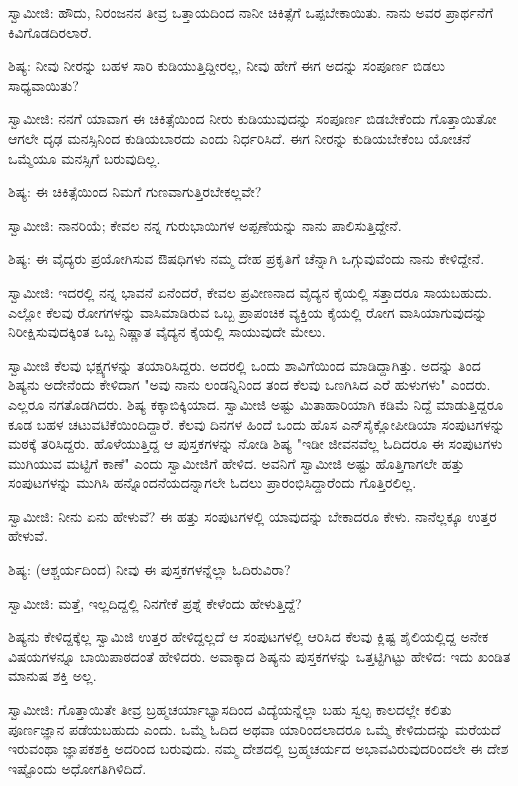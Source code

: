 ಸ್ವಾಮೀಜಿ: ಹೌದು, ನಿರಂಜನನ ತೀವ್ರ ಒತ್ತಾಯದಿಂದ ನಾನೀ ಚಿಕಿತ್ಸೆಗೆ ಒಪ್ಪಬೇಕಾಯಿತು. ನಾನು ಅವರ ಪ್ರಾರ್ಥನೆಗೆ ಕಿವಿಗೊಡದಿರಲಾರೆ.

ಶಿಷ್ಯ: ನೀವು ನೀರನ್ನು ಬಹಳ ಸಾರಿ ಕುಡಿಯುತ್ತಿದ್ದೀರಲ್ಲ, ನೀವು ಹೇಗೆ ಈಗ ಅದನ್ನು ಸಂಪೂರ್ಣ ಬಿಡಲು ಸಾಧ್ಯವಾಯಿತು?

ಸ್ವಾಮೀಜಿ: ನನಗೆ ಯಾವಾಗ ಈ ಚಿಕಿತ್ಸೆಯಿಂದ ನೀರು ಕುಡಿಯುವುದನ್ನು ಸಂಪೂರ್ಣ ಬಿಡಬೇಕೆಂದು ಗೊತ್ತಾಯಿತೋ ಆಗಲೇ ದೃಢ ಮನಸ್ಸಿನಿಂದ ಕುಡಿಯಬಾರದು ಎಂದು ನಿರ್ಧರಿಸಿದೆ. ಈಗ ನೀರನ್ನು ಕುಡಿಯಬೇಕೆಂಬ ಯೋಚನೆ ಒಮ್ಮೆಯೂ ಮನಸ್ಸಿಗೆ ಬರುವುದಿಲ್ಲ.

ಶಿಷ್ಯ: ಈ ಚಿಕಿತ್ಸೆಯಿಂದ ನಿಮಗೆ ಗುಣವಾಗುತ್ತಿರಬೇಕಲ್ಲವೇ?

ಸ್ವಾಮೀಜಿ: ನಾನರಿಯೆ; ಕೇವಲ ನನ್ನ ಗುರುಭಾಯಿಗಳ ಅಪ್ಪಣೆಯನ್ನು ನಾನು ಪಾಲಿಸುತ್ತಿದ್ದೇನೆ.

ಶಿಷ್ಯ: ಈ ವೈದ್ಯರು ಪ್ರಯೋಗಿಸುವ ಔಷಧಿಗಳು ನಮ್ಮ ದೇಹ ಪ್ರಕೃತಿಗೆ ಚೆನ್ನಾಗಿ ಒಗ್ಗುವುವೆಂದು ನಾನು ಕೇಳಿದ್ದೇನೆ.

ಸ್ವಾಮೀಜಿ: ಇದರಲ್ಲಿ ನನ್ನ ಭಾವನೆ ಏನೆಂದರೆ, ಕೇವಲ ಪ್ರವೀಣನಾದ ವೈದ್ಯನ ಕೈಯಲ್ಲಿ ಸತ್ತಾದರೂ ಸಾಯಬಹುದು. ಎಲ್ಲೋ ಕೆಲವು ರೋಗಗಳನ್ನು ವಾಸಿಮಾಡಿರುವ ಒಬ್ಬ ಪ್ರಾಪಂಚಿಕ ವ್ಯಕ್ತಿಯ ಕೈಯಲ್ಲಿ ರೋಗ ವಾಸಿಯಾಗುವುದನ್ನು ನಿರೀಕ್ಷಿಸುವುದಕ್ಕಿಂತ ಒಬ್ಬ ನಿಷ್ಣಾತ ವೈದ್ಯನ ಕೈಯಲ್ಲಿ ಸಾಯುವುದೇ ಮೇಲು.

ಸ್ವಾಮೀಜಿ ಕೆಲವು ಭಕ್ಷ್ಯಗಳನ್ನು ತಯಾರಿಸಿದ್ದರು. ಅದರಲ್ಲಿ ಒಂದು ಶಾವಿಗೆಯಿಂದ ಮಾಡಿದ್ದಾಗಿತ್ತು. ಅದನ್ನು ತಿಂದ ಶಿಷ್ಯನು ಅದೇನೆಂದು ಕೇಳಿದಾಗ "ಅವು ನಾನು ಲಂಡನ್ನಿನಿಂದ ತಂದ ಕೆಲವು ಒಣಗಿಸಿದ ಎರೆ ಹುಳುಗಳು" ಎಂದರು. ಎಲ್ಲರೂ ನಗತೊಡಗಿದರು. ಶಿಷ್ಯ ಕಕ್ಕಾಬಿಕ್ಕಿಯಾದ. ಸ್ವಾಮೀಜಿ ಅಷ್ಟು ಮಿತಾಹಾರಿಯಾಗಿ ಕಡಿಮೆ ನಿದ್ದೆ ಮಾಡುತ್ತಿದ್ದರೂ ಕೂಡ ಬಹಳ ಚಟುವಟಿಕೆಯಿಂದಿದ್ದಾರೆ. ಕೆಲವು ದಿನಗಳ ಹಿಂದೆ ಒಂದು ಹೊಸ ಎನ್‌ಸೈಕ್ಲೋಪೀಡಿಯಾ ಸಂಪುಟಗಳನ್ನು ಮಠಕ್ಕೆ ತರಿಸಿದ್ದರು. ಹೊಳೆಯುತ್ತಿದ್ದ ಆ ಪುಸ್ತಕಗಳನ್ನು ನೋಡಿ ಶಿಷ್ಯ "ಇಡೀ ಜೀವನವೆಲ್ಲ ಓದಿದರೂ ಈ ಸಂಪುಟಗಳು ಮುಗಿಯುವ ಮಟ್ಟಿಗೆ ಕಾಣೆ" ಎಂದು ಸ್ವಾಮೀಜಿಗೆ ಹೇಳಿದ. ಅವನಿಗೆ ಸ್ವಾಮೀಜಿ ಅಷ್ಟು ಹೊತ್ತಿಗಾಗಲೇ ಹತ್ತು ಸಂಪುಟಗಳನ್ನು ಮುಗಿಸಿ ಹನ್ನೊಂದನೆಯದನ್ನಾಗಲೇ ಓದಲು ಪ್ರಾರಂಭಿಸಿದ್ದಾರೆಂದು ಗೊತ್ತಿರಲಿಲ್ಲ.

ಸ್ವಾಮೀಜಿ: ನೀನು ಏನು ಹೇಳುವೆ? ಈ ಹತ್ತು ಸಂಪುಟಗಳಲ್ಲಿ ಯಾವುದನ್ನು ಬೇಕಾದರೂ ಕೇಳು. ನಾನೆಲ್ಲಕ್ಕೂ ಉತ್ತರ ಹೇಳುವೆ.

ಶಿಷ್ಯ: (ಆಶ್ಚರ್ಯದಿಂದ) ನೀವು ಈ ಪುಸ್ತಕಗಳನ್ನೆಲ್ಲಾ ಓದಿರುವಿರಾ?

ಸ್ವಾಮೀಜಿ: ಮತ್ತೆ, ಇಲ್ಲದಿದ್ದಲ್ಲಿ ನಿನಗೇಕೆ ಪ್ರಶ್ನೆ ಕೇಳೆಂದು ಹೇಳುತ್ತಿದ್ದೆ?

ಶಿಷ್ಯನು ಕೇಳಿದ್ದಕ್ಕೆಲ್ಲ ಸ್ವಾಮಿಜಿ ಉತ್ತರ ಹೇಳಿದ್ದಲ್ಲದೆ ಆ ಸಂಪುಟಗಳಲ್ಲಿ ಆರಿಸಿದ ಕೆಲವು ಕ್ಲಿಷ್ಟ ಶೈಲಿಯಲ್ಲಿದ್ದ ಅನೇಕ ವಿಷಯಗಳನ್ನೂ ಬಾಯಿಪಾಠದಂತೆ ಹೇಳಿದರು. ಅವಾಕ್ಕಾದ ಶಿಷ್ಯನು ಪುಸ್ತಕಗಳನ್ನು ಒತ್ತಟ್ಟಿಗಿಟ್ಟು ಹೇಳಿದ: ಇದು ಖಂಡಿತ ಮಾನುಷ ಶಕ್ತಿ ಅಲ್ಲ.

ಸ್ವಾಮೀಜಿ: ಗೊತ್ತಾಯಿತೇ ತೀವ್ರ ಬ್ರಹ್ಮಚರ್ಯಾಭ್ಯಾಸದಿಂದ ವಿದ್ಯೆಯನ್ನೆಲ್ಲಾ ಬಹು ಸ್ವಲ್ಪ ಕಾಲದಲ್ಲೇ ಕಲಿತು ಪೂರ್ಣಜ್ಞಾನ ಪಡೆಯಬಹುದು ಎಂದು. ಒಮ್ಮೆ ಓದಿದ ಅಥವಾ ಯಾರಿಂದಲಾದರೂ ಒಮ್ಮೆ ಕೇಳಿದುದನ್ನು ಮರೆಯದೆ ಇರುವಂಥಾ ಜ್ಞಾಪಕಶಕ್ತಿ ಅದರಿಂದ ಬರುವುದು. ನಮ್ಮ ದೇಶದಲ್ಲಿ ಬ್ರಹ್ಮಚರ್ಯದ ಅಭಾವವಿರುವುದರಿಂದಲೇ ಈ ದೇಶ ಇಷ್ಟೊಂದು ಅಧೋಗತಿಗಿಳಿದಿದೆ.

